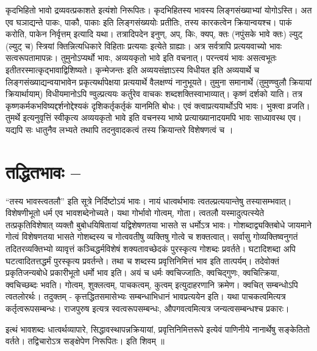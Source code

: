 कृदभिहितो भावो द्रव्यवत्प्रकाशते इत्यंशो निरूपितः। कृदभिहितस्य भावस्य लिङ्गसंख्याभ्यां योगोऽस्ति। अत एव घञाद्यन्ते पाकः, पाकौ, पाकाः इति लिङ्गसंख्ययोः प्रतीतिः, तस्य कारकत्वेन क्रियान्वयश्च। पाकं करोति, पाकेन निर्वृत्तम् इत्यादि यथा। तत्रादिपदेन इनुण्, अप्, किः, क्यप्, क्तः (नपुंसके भावे क्तः) ल्युट् (ल्युट् च) स्त्रियां क्तिन्नित्यधिकारे विहिताः प्रत्ययाः इत्येते ग्राह्याः। अत्र सर्वत्रापि प्रत्ययवाच्यो भावः सत्वरूपतामापन्नः। तुमुनोऽप्यर्थो भावः, अव्ययकृतो भावे इति वचनात्। परन्त्वयं भावः असत्वभूतः इतीतरस्मात्कृद्भावाद्विशिष्यते। कृन्मेजन्तः इति अव्ययसंज्ञाऽस्य विधीयत इति अव्ययार्थे च लिङ्गसंख्याद्यन्वयाभावेन प्रकृत्यर्थापेक्षया प्रत्ययार्थे वैलक्षण्यं नानुभूयते। तुमुना समानार्थे (तुमुण्ण्वुलौ क्रियायां क्रियार्थायाम्) विधीयमानोऽपि ण्वुल्प्रत्ययः कर्तुरेव वाचकः शब्दशक्तिस्वाभाव्यात्। कृष्णं दर्शको याति। तत्र कृष्णकर्मकभविष्यद्दर्शनोद्देश्यकं दृशिकर्तृकर्तृकं यानमिति बोधः। एवं क्त्वाप्रत्ययार्थोऽपि भावः। भुक्त्वा व्रजति। तुमर्थे इत्यनुवृत्तिं स्वीकृत्य अव्ययकृतो भावे इति वचनस्य भाष्ये प्रत्याख्यानादयमपि भावः साध्यावस्थ एव। यद्यपि सः धातुनैव लभ्यते तथापि तदनुवादकत्वं तस्य क्रियान्तरे विशेषणत्वं च ।

\section*{तद्धितभावः –}

“तस्य भावस्त्वतलौ” इति सूत्रे निर्दिष्टोऽयं भावः। नायं धात्वर्थभावः त्वतल्प्रत्ययान्तेषु तस्यासम्भवात्। विशेषणीभूतो धर्म एव भावशब्देनोच्यते। यथा गोर्भावो गोत्वम्, गोता। त्वतलौ यस्मादुत्पत्स्येते तत्प्रकृतिविशेषात् व्यक्तौ बुबोधयिषितायां यद्विशेषणतया भासते स धर्मोऽत्र भावः। गोशब्दाद्व्यक्तिबोधे जायमाने गोत्वं विशेषणतया भासते गोशब्दस्य च गोत्ववतीषु व्यक्तिषु गोत्वे च शक्तत्वात्। सर्वासु गोव्यक्तिष्वनुगतं तदितरव्यक्तिभ्यो व्यावृत्तं कञ्चिद्धर्मविशेषं शक्यतावच्छेदकं पुरस्कृत्य गोशब्दः प्रवर्तते। घटादिशब्दा अपि घटत्वादितत्तद्धर्मं पुरस्कृत्य प्रवर्तन्ते। तथा च शब्दस्य प्रवृत्तिनिमित्तं भाव इति तात्पर्यम्। तदेवोक्तं प्रकृतिजन्यबोधे प्रकारीभूतो धर्मो भाव इति। अयं च धर्मः क्वचिज्जातिः, क्वचिद्गुणः, क्वचित्क्रिया, क्वचिच्छब्दः भवति। गोत्वम्, शुक्लत्वम्, पाचकत्वम्, कुत्वम् इत्युदाहरणानि क्रमेण। क्वचित् सम्बन्धोऽपि त्वतलोरर्थः। तदुक्तम् - कृत्तद्धितसमासेभ्यः सम्बन्धाभिधानं भावप्रत्ययेन इति। यथा पाचकत्वमित्यत्र कर्तृत्वरूपसम्बन्धः। राजपुरुष इत्यत्र स्वत्वरूपसम्बन्धः, औपगवत्वमित्यत्र जन्यत्वसम्बन्धश्च प्रकारः।

इत्थं भावशब्दः धात्वर्थव्यापारे, सिद्धावस्थापन्नक्रियायां, प्रवृत्तिनिमित्तरूपे इत्येवं पाणिनीये नानार्थेषु सङ्केतितो वर्तते। तद्विचारोऽत्र सङ्क्षेपेण निरूपितः। इति शिवम् ॥
